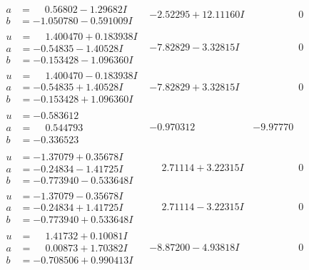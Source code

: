 \documentclass[1p]{elsarticle_modified}
\theoremstyle{definition}
\begin{document}
$$\begin{array}{c|c|c}
\begin{aligned}
a &= \phantom{-}0.56802 - 1.29682 I \\
b &= -1.050780 - 0.591009 I\end{aligned}
 & -2.52295 + 12.11160 I & \phantom{-0.000000 } 0 \\ \hline\begin{aligned}
u &= \phantom{-}1.400470 + 0.183938 I \\
a &= -0.54835 - 1.40528 I \\
b &= -0.153428 - 1.096360 I\end{aligned}
 & -7.82829 - 3.32815 I & \phantom{-0.000000 } 0 \\ \hline\begin{aligned}
u &= \phantom{-}1.400470 - 0.183938 I \\
a &= -0.54835 + 1.40528 I \\
b &= -0.153428 + 1.096360 I\end{aligned}
 & -7.82829 + 3.32815 I & \phantom{-0.000000 } 0 \\ \hline\begin{aligned}
u &= -0.583612\phantom{ +0.000000I} \\
a &= \phantom{-}0.544793\phantom{ +0.000000I} \\
b &= -0.336523\phantom{ +0.000000I}\end{aligned}
 & -0.970312\phantom{ +0.000000I} & -9.97770\phantom{ +0.000000I} \\ \hline\begin{aligned}
u &= -1.37079 + 0.35678 I \\
a &= -0.24834 - 1.41725 I \\
b &= -0.773940 - 0.533648 I\end{aligned}
 & \phantom{-}2.71114 + 3.22315 I & \phantom{-0.000000 } 0 \\ \hline\begin{aligned}
u &= -1.37079 - 0.35678 I \\
a &= -0.24834 + 1.41725 I \\
b &= -0.773940 + 0.533648 I\end{aligned}
 & \phantom{-}2.71114 - 3.22315 I & \phantom{-0.000000 } 0 \\ \hline\begin{aligned}
u &= \phantom{-}1.41732 + 0.10081 I \\
a &= \phantom{-}0.00873 + 1.70382 I \\
b &= -0.708506 + 0.990413 I\end{aligned}
 & -8.87200 - 4.93818 I & \phantom{-0.000000 } 0 \\ \hline\begin{aligned}

\end{aligned}
\end{array}$$
\end{document}

